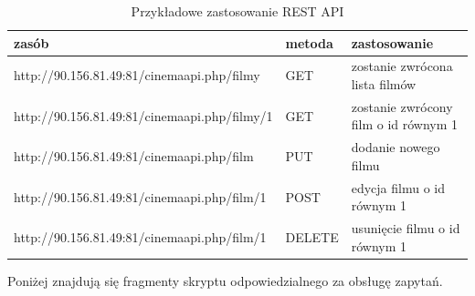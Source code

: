 \begin{table}[H]
\centering

\label{restApi}
\begin{tabular}{|l|l|l|}
\hline
\textbf{zasób}                               & \textbf{metoda} & \textbf{zastosowanie}                \\ \hline
http://90.156.81.49:81/cinemaapi.php/filmy   & GET             & zostanie zwrócona lista filmów       \\ \hline
http://90.156.81.49:81/cinemaapi.php/filmy/1 & GET             & zostanie zwrócony film o id równym 1 \\ \hline
http://90.156.81.49:81/cinemaapi.php/film    & PUT             & dodanie nowego filmu                 \\ \hline
http://90.156.81.49:81/cinemaapi.php/film/1  & POST            & edycja filmu o id równym 1           \\ \hline
http://90.156.81.49:81/cinemaapi.php/film/1  & DELETE          & usunięcie filmu o id równym 1        \\ \hline
\end{tabular}
\caption{Przykładowe zastosowanie REST API}
\end{table}

Poniżej znajdują się fragmenty skryptu odpowiedzialnego za obsługę zapytań.




